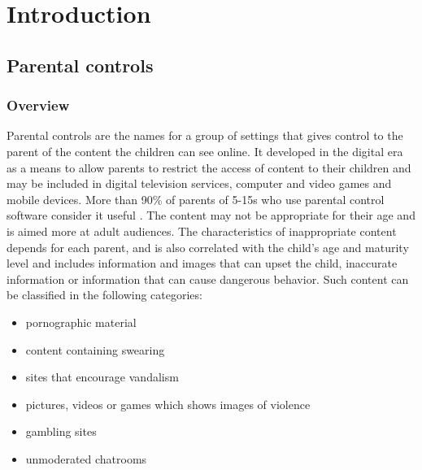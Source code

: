 
\chapter{Introduction} %

\label{Chapter1} %


\newcommand{\keyword}[1]{\textbf{#1}}
\newcommand{\tabhead}[1]{\textbf{#1}}
\newcommand{\code}[1]{\texttt{#1}}
\newcommand{\file}[1]{\texttt{\bfseries#1}}
\newcommand{\option}[1]{\texttt{\itshape#1}}


\section{Parental controls}

\subsection{Overview}
Parental controls \cite{parentalControls} are the names for a group of settings that gives control to the parent of the content the children can see online. It developed in the digital era as a means to allow parents to restrict the access of content to their children and may be included in digital television services, computer and video games and mobile devices. More than 90\% of parents  of 5-15s who use parental control software consider it useful \citep{ofcom2017children}. The content may not be appropriate for their age and is aimed more at adult audiences. The characteristics of inappropriate content depends for each parent, and is also correlated with the child's age and maturity level and includes information and images that can upset the child, inaccurate information or information that can cause dangerous behavior. Such content can be classified in the following categories:

\begin{itemize}
\item pornographic material
\item content containing swearing
\item sites that encourage vandalism
\item pictures, videos or games which shows images of violence
\item gambling sites
\item unmoderated chatrooms
\end{itemize}

